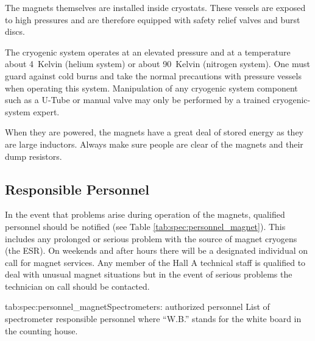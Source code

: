 \begin{safetyen}{0}{0}
The magnets themselves are installed inside cryostats.  These vessels 
are exposed to high pressures and are therefore equipped with safety 
relief valves and burst discs.   

The cryogenic system operates at an elevated pressure and at a temperature 
about 4~Kelvin (helium system) or about 90~Kelvin (nitrogen system).  One must
guard against cold burns and take the normal precautions with pressure
vessels when operating this system.  Manipulation of any cryogenic system
component such as a U-Tube or manual valve may only be performed by
a trained cryogenic-system expert.

When they are powered, the magnets have a great deal of stored energy as they are large 
inductors. Always make sure people are clear of the magnets and their dump resistors.

\subsection{Responsible Personnel}

In the event that problems arise during 
operation of the magnets, qualified personnel should be notified
(see Table \ref{tab:spec:personnel_magnet}).  
This includes any prolonged or serious problem with the source of magnet 
cryogens (the ESR).  On weekends and after hours there will be a 
designated individual on call for magnet services.  Any member of the 
Hall A technical staff is qualified to deal with unusual magnet 
situations but in the event of serious problems the technician on
call should be contacted.

\begin{namestab}{tab:spec:personnel_magnet}{Spectrometers: authorized personnel}{%
      List of spectrometer responsible personnel where ``W.B.'' stands for the white board 
      in the counting house.}
   \PaulBrindza{}
   \SteveLassiter{}
   \EricSun{}
   \MikeFowler{}
   \JoeBeaufait{}
   \JackSegal{}
   \MahlonLong{}
\end{namestab}


\end{safetyen}

